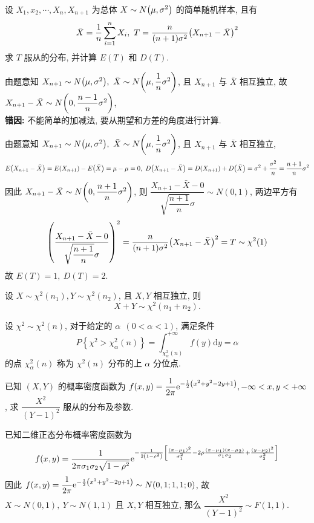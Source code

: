 \begin{example}
    设 $X_1,x_2,\cdots,X_n,X_{n+1}$ 为总体 $X\sim N\qty(\mu,\sigma^2)$ 的简单随机样本, 且有 $$\bar{X}=\dfrac{1}{n}\displaystyle\sum_{i=1}^{n}X_i,~T=\dfrac{n}{(n+1)\sigma^2}\qty(X_{n+1}-\bar{X})^2$$
    求 $T$ 服从的分布, 并计算 $E(T)$ 和 $D(T)$.
\end{example}
\begin{errorSolution}
    由题意知 $X_{n+1}\sim N\qty(\mu,\sigma^2),~\bar{X}\sim N\qty(\mu,\dfrac{1}{n}\sigma^2)$, 且 $X_{n+1}$ 与 $\bar{X}$ 相互独立, 故 $X_{n+1}-\bar{X}\sim N\qty(0,\dfrac{n-1}{n}\sigma^2)$, \\
    \textbf{错因: }不能简单的加减法, 要从期望和方差的角度进行计算.\\
\end{errorSolution}
\begin{solution}
    由题意知 $X_{n+1}\sim N\qty(\mu,\sigma^2),~\bar{X}\sim N\qty(\mu,\dfrac{1}{n}\sigma^2)$, 且 $X_{n+1}$ 与 $\bar{X}$ 相互独立, 
    $$E\qty(X_{n+1}-\bar{X})=E(X_{n+1})-E\qty(\bar{X})=\mu-\mu=0,~D\qty(X_{n+1}-\bar{X})=D(X_{n+1})+D\qty(\bar{X})=\sigma^2+\dfrac{\sigma^2}{n}=\dfrac{n+1}{n}\sigma^2$$
    因此 $X_{n+1}-\bar{X}\sim N\qty(0,\dfrac{n+1}{n}\sigma^2)$, 则 $\dfrac{X_{n+1}-\bar{X}-0}{\sqrt{\dfrac{n+1}{n}}\sigma}\sim N(0,1)$, 两边平方有
    $$\qty(\dfrac{X_{n+1}-\bar{X}-0}{\sqrt{\dfrac{n+1}{n}}\sigma})^2=\dfrac{n}{(n+1)\sigma^2}\qty(X_{n+1}-\bar{X})^2=T\sim\chi^2(1)$$
    故 $E(T)=1,~D(T)=2.$
\end{solution}

\begin{theorem}[分布的可加性]
    设 $ X \sim \chi^{2}\left(n_{1}\right), Y \sim \chi^{2}\left(n_{2}\right) $, 且 $ X, Y $ 相互独立, 则
    $$X+Y \sim \chi^{2}\left(n_{1}+n_{2}\right) .$$
\end{theorem}

\begin{theorem}
    设 $ \chi^{2} \sim \chi^{2}(n) $, 对于给定的 $ \alpha~~(0<\alpha<1) $, 满足条件
    $$P\left\{\chi^{2}>\chi_{\alpha}^{2}(n)\right\}=\int_{\chi_{\alpha}^{2}(n)}^{+\infty} f(y) \mathrm{d} y=\alpha$$
    的点 $ \chi_{\alpha}^{2}(n) $ 称为 $ \chi^{2}(n) $ 分布的上 $ \alpha $ 分位点.
\end{theorem}

\begin{example}
    已知 $(X,Y)$ 的概率密度函数为 $\displaystyle f(x,y)=\dfrac{1}{2\pi}\mathrm{e}^{-\frac{1}{2}\qty(x^2+y^2-2y+1)},-\infty<x,y<+\infty$, 求 $\dfrac{X^2}{(Y-1)^2}$ 服从的分布及参数.
\end{example}
\begin{solution}
    已知二维正态分布概率密度函数为 $$f(x,y)=\dfrac{1}{2\pi\sigma_1\sigma_2\sqrt{1-\rho^2}}\mathrm{e}^{-\frac{1}{2\qty(1-\rho^2)}\qty[\frac{(x-\mu_1)^2}{\sigma_1^2}-2\rho\frac{(x-\mu_1)(x-\mu_2)}{\sigma_1\sigma_2}+\frac{(y-\mu_2)^2}{\sigma_2^2}]}$$
    因此 $f(x,y)=\dfrac{1}{2\pi}\mathrm{e}^{-\frac{1}{2}\qty(x^2+y^2-2y+1)}\sim N(0,1;1,1;0)$, 故 $X\sim N(0,1),~Y\sim N(1,1)$ 且 $X,Y$ 相互独立, 那么 $\dfrac{X^2}{(Y-1)^2}\sim F(1,1).$
\end{solution}

